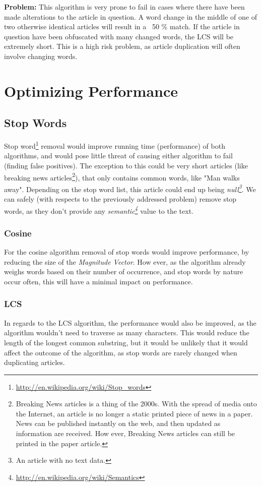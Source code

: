 \textbf{Problem:} This algorithm is very prone to fail in cases where there have been made alterations to the article in question. A word change in the middle of one of two otherwise identical articles will result in a ~50 \% match. If the article in question have been obfuscated with many changed words, the LCS will be extremely short. This is a high risk problem, as article duplication will often involve changing words.


\section{Optimizing Performance}
\subsection{Stop Words}
Stop word\footnote{\url{http://en.wikipedia.org/wiki/Stop_words}} removal would improve running time (performance) of both algorithms, and would pose little threat of causing either algorithm to fail (finding false positives). The exception to this could be very short articles (like breaking news articles\footnote{Breaking News articles is a thing of the 2000s. With the spread of media onto the Internet, an article is no longer a static printed piece of news in a paper. News can be published instantly on the web, and then updated as information are received. How ever, Breaking News articles can still be printed in the paper article.}), that only contains common words, like "Man walks away". Depending on the stop word list, this article could end up being \textit{null\footnote{An article with no text data.}}.
We can safely (with respects to the previously addressed problem) remove stop words, as they don't provide any \textit{semantic\footnote{\url{http://en.wikipedia.org/wiki/Semantics}}} value to the text.

\subsubsection{Cosine}
For the cosine algorithm removal of stop words would improve performance, by reducing the size of the \textit{Magnitude Vector}. How ever, as the algorithm already weighs words based on their number of occurrence, and stop words by nature occur often, this will have a minimal impact on performance.

\subsubsection{LCS}
In regards to the LCS algorithm, the performance would also be improved, as the algorithm wouldn't need to traverse as many characters. This would reduce the length of the longest common substring, but it would be unlikely that it would affect the outcome of the algorithm, as stop words are rarely changed when duplicating articles.

